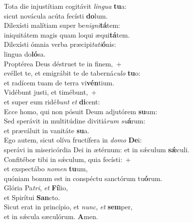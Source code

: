 \evenverse Tota die injustítiam cogitávit \textit{lin}\textit{gua} \textbf{tu}a:~\*\\
\evenverse sicut novácula acúta fecísti \textbf{do}lum.\\
\oddverse Dilexísti malítiam super be\textit{ni}\textit{gni}\textbf{tá}tem:~\*\\
\oddverse iniquitátem magis quam loqui æqui\textbf{tá}tem.\\
\evenverse Dilexísti ómnia verba præcipi\textit{ta}\textit{ti}\textbf{ó}nis:~\*\\
\evenverse lingua do\textbf{ló}sa.\\
\oddverse Proptérea Deus déstruet te in finem,~+\\
\oddverse  evéllet te, et emigrábit te de taberná\textit{cu}\textit{lo} \textbf{tu}o:~\*\\
\oddverse et radícem tuam de terra vi\textbf{vén}tium.\\
\evenverse Vidébunt justi, et timébunt,~+\\
\evenverse  et super eum ridé\textit{bunt} \textit{et} \textbf{di}cent:~\*\\
\evenverse Ecce homo, qui non pósuit Deum adjutórem \textbf{su}um:\\
\oddverse Sed sperávit in multitúdine divitiá\textit{rum} \textit{su}\textbf{á}rum:~\*\\
\oddverse et præváluit in vanitáte \textbf{su}a.\\
\evenverse Ego autem, sicut olíva fructífera in \textit{do}\textit{mo} \textbf{De}i:~\*\\
\evenverse sperávi in misericórdia Dei in ætérnum: et in sǽculum \textbf{sǽ}culi.\\
\oddverse Confitébor tibi in sǽculum, quia fecísti:~+\\
\oddverse  et exspectábo \textit{no}\textit{men} \textbf{tu}um,~\*\\
\oddverse quóniam bonum est in conspéctu sanctórum tu\textbf{ó}rum.\\
\evenverse Glória Pa\textit{tri}, \textit{et} \textbf{Fí}lio,~\*\\
\evenverse et Spirítui \textbf{San}cto.\\
\oddverse Sicut erat in princípio, et \textit{nunc}, \textit{et} \textbf{sem}per,~\*\\
\oddverse et in sǽcula sæculórum. \textbf{A}men.\\
